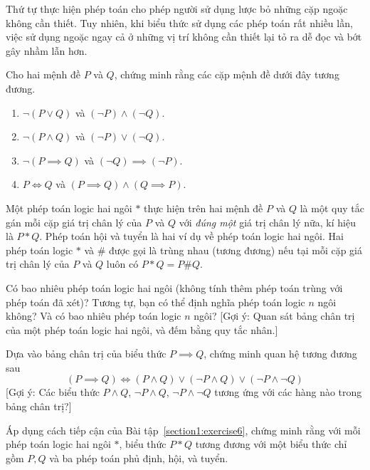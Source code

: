 Thứ tự thực hiện phép toán cho phép người sử dụng lược bỏ những cặp ngoặc không cần thiết. Tuy nhiên, khi biểu thức sử dụng các phép toán rất nhiều lần, việc sử dụng ngoặc ngay cả ở những vị trí không cần thiết lại tỏ ra dễ đọc và bớt gây nhầm lẫn hơn.

\begin{exercise}\label{propositional-logic:exercise4}
    Cho hai mệnh đề $P$ và $Q$, chứng minh rằng các cặp mệnh đề dưới đây tương đương.
    \begin{enumerate}[label={(\alph*)},itemsep=0pt]
        \item $\neg (P\vee Q)$ và $(\neg P) \wedge (\neg Q)$.
        \item $\neg (P\wedge Q)$ và $(\neg P)\vee (\neg Q)$.
        \item $\neg (P\implies Q)$ và $(\neg Q)\implies (\neg P)$.
        \item $P\Leftrightarrow Q$ và $(P\implies Q) \wedge (Q\implies P)$.
    \end{enumerate}
\end{exercise}

\begin{exercise}\label{propositional-logic:exercise5}
    Một phép toán logic hai ngôi $*$ thực hiện trên hai mệnh đề $P$ và $Q$ là một quy tắc gán mỗi cặp giá trị chân lý của $P$ và $Q$ với \textit{đúng một} giá trị chân lý nữa, kí hiệu là $P * Q$. Phép toán hội và tuyển là hai ví dụ về phép toán logic hai ngôi. Hai phép toán logic $*$ và $\#$ được gọi là trùng nhau (tương đương) nếu tại mỗi cặp giá trị chân lý của $P$ và $Q$ luôn có $P * Q = P\# Q$.

    Có bao nhiêu phép toán logic hai ngôi (không tính thêm phép toán trùng với phép toán đã xét)? Tương tự, bạn có thể định nghĩa phép toán logic $n$ ngôi không? Và có bao nhiêu phép toán logic $n$ ngôi? [Gợi ý: Quan sát bảng chân trị của một phép toán logic hai ngôi, và đếm bằng quy tắc nhân.]
\end{exercise}

\begin{exercise}\label{propositional-logic:exercise6}
    Dựa vào bảng chân trị của biểu thức $P\implies Q$, chứng minh quan hệ tương đương sau
    \[
        (P\implies Q) \Leftrightarrow (P\wedge Q)\vee (\neg P\wedge Q) \vee (\neg P\wedge \neg Q)
    \]
    [Gợi ý: Các biểu thức $P\wedge Q$, $\neg P\wedge Q$, $\neg P\wedge \neg Q$ tương ứng với các hàng nào trong bảng chân trị?]
\end{exercise}

\begin{exercise}\label{propositional-logic:exercise7}
    Áp dụng cách tiếp cận của Bài tập~\ref{section1:exercise6}, chứng minh rằng với mỗi phép toán logic hai ngôi $*$, biểu thức $P * Q$ tương đương với một biểu thức chỉ gồm $P, Q$ và ba phép toán phủ định, hội, và tuyển.
\end{exercise}

